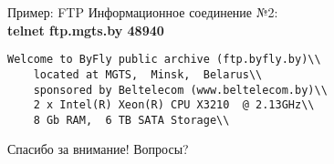 \begin{frame}{Пример: FTP}
Информационное соединение №2:\\
\medskip
\scriptsize
{\bfseries telnet ftp.mgts.by 48940}\\
\begin{verbatim}
Welcome to ByFly public archive (ftp.byfly.by)\\
	located at MGTS,  Minsk,  Belarus\\
	sponsored by Beltelecom (www.beltelecom.by)\\
	2 x Intel(R) Xeon(R) CPU X3210  @ 2.13GHz\\
	8 Gb RAM,  6 TB SATA Storage\\
\end{verbatim}
\normalsize
\end{frame}


\begin{frame}{}
\Huge
\begin{center}
	Спасибо за внимание!
	\bigskip
	Вопросы?
\end{center}
\normalsize
\end{frame}



